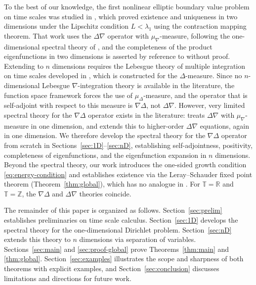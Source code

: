 \documentclass{article}
\numberwithin{equation}{section}
\numberwithin{theorem}{section}
\begin{document}
To the best of our knowledge, the first nonlinear elliptic boundary value problem on time scales was studied in \cite{Huseynov-2009}, which proved existence and uniqueness in two dimensions under the Lipschitz condition $L < \lambda_1$ using the contraction mapping theorem. That work uses the $\Delta\nabla$ operator with $\mu_\nabla$-measure, following the one-dimensional spectral theory of \cite{Guseinov-EF}, and the completeness of the product eigenfunctions in two dimensions is asserted by reference to \cite{Guseinov-EF} without proof. Extending to $n$ dimensions requires the Lebesgue theory of multiple integration on time scales developed in \cite{Bohner-Guseinov-Lebesgue}, which is constructed for the $\Delta$-measure. Since no $n$-dimensional Lebesgue $\nabla$-integration theory is available in the literature, the function space framework forces the use of $\mu_\Delta$-measure, and the operator that is self-adjoint with respect to this measure is $\nabla\Delta$, not $\Delta\nabla$. However, very limited spectral theory \cite[(Rem. 3.4)]{Guseinov-EF} for the $\nabla\Delta$ operator exists in the literature: \cite{Guseinov-EF} treats $\Delta\nabla$ with $\mu_\nabla$-measure in one dimension, and \cite{anderson2006higher} extends this to higher-order $\Delta\nabla$ equations, again in one dimension. We therefore develop the spectral theory for the $\nabla\Delta$ operator from scratch in Sections~\ref{sec:1D}--\ref{sec:nD}, establishing self-adjointness, positivity, completeness of eigenfunctions, and the eigenfunction expansion in $n$ dimensions. Beyond the spectral theory, our work introduces the one-sided growth condition \eqref{eq:energy-condition} and establishes existence via the Leray--Schauder fixed point theorem (Theorem~\ref{thm:global}), which has no analogue in \cite{Huseynov-2009}. For $\mathbb{T} = \mathbb{R}$ and $\mathbb{T} = \mathbb{Z}$, the $\nabla\Delta$ and $\Delta\nabla$ theories coincide.

The remainder of this paper is organized as follows. Section~\ref{sec:prelim} establishes preliminaries on time scale calculus. Section~\ref{sec:1D} develops the spectral theory for the one-dimensional Dirichlet problem. Section~\ref{sec:nD} extends this theory to $n$ dimensions via separation of variables. Sections~\ref{sec:main} and \ref{sec:proof-global} prove Theorems~\ref{thm:main} and \ref{thm:global}. Section~\ref{sec:examples} illustrates the scope and sharpness of both theorems with explicit examples, and Section~\ref{sec:conclusion} discusses limitations and directions for future work.
\end{document}
